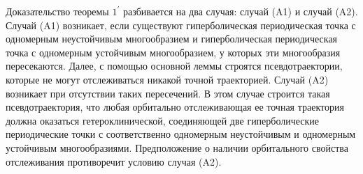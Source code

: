 \documentclass[12pt]{article}
\begin{document}
{%

Доказательство теоремы $1^{\prime}$ разбивается на два случая: слу\-чай (A1) и случай (A2). Случай (A1) возникает, если существуют гиперболическая периодическая точка с одномерным неустойчивым многообразием и гиперболическая периодическая точка с одномерным устойчивым многообразием, у которых эти многообразия пересекаются. %
Да\-лее, с помощью основной леммы строятся псевдотраектории, которые не могут отслеживаться никакой точной траекторией.
Слу\-чай (A2) возникает при отсутствии таких пе\-ре\-сечений. 
В этом случае строится такая псевдотраектория, что лю\-бая ор\-би\-та\-ль\-но отслеживающая ее точная 
траектория должна оказаться ге\-те\-ро\-кли\-нической, соединяющей две гиперболические периодичес\-кие точ\-ки с соответственно одномерным неустойчивым и одномерным ус\-той\-чивым многообразиями. Предположение о наличии орбитального свой\-с\-тва отслеживания противоречит условию случая (A2).

}
\end{document}
